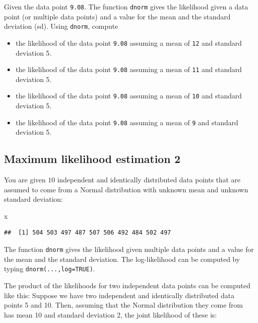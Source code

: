 \documentclass[12pt,]{krantz}
\newenvironment{Shaded}{\begin{snugshade}}{\end{snugshade}}
\newcommand{\NormalTok}[1]{#1}
\providecommand{\tightlist}{%
  \setlength{\itemsep}{0pt}\setlength{\parskip}{0pt}}
\theoremstyle{definition}
\theoremstyle{definition}
\theoremstyle{definition}
\theoremstyle{remark}
\begin{document}
Given the data point \texttt{9.08}.
The function \texttt{dnorm} gives the likelihood given a data point (or multiple data points) and a value for the mean and the standard deviation (sd). Using \texttt{dnorm}, compute

\begin{itemize}
\tightlist
\item
  the likelihood of the data point \texttt{9.08} assuming a mean of \texttt{12} and standard deviation 5.
\item
  the likelihood of the data point \texttt{9.08} assuming a mean of \texttt{11} and standard deviation 5.
\item
  the likelihood of the data point \texttt{9.08} assuming a mean of \texttt{10} and standard deviation 5.
\item
  the likelihood of the data point \texttt{9.08} assuming a mean of \texttt{9} and standard deviation 5.
\end{itemize}

\hypertarget{maximum-likelihood-estimation-2}{%
\subsection{Maximum likelihood estimation 2}\label{maximum-likelihood-estimation-2}}

You are given \(10\) independent and identically distributed data points that are assumed to come from a Normal distribution with unknown mean and unknown standard deviation:

\begin{Shaded}
\begin{Highlighting}[]
\NormalTok{x}
\end{Highlighting}
\end{Shaded}

\begin{verbatim}
##  [1] 504 503 497 487 507 506 492 484 502 497
\end{verbatim}

The function \texttt{dnorm} gives the likelihood given multiple data points and a value for the mean and the standard deviation. The log-likelihood can be computed by typing \texttt{dnorm(...,log=TRUE)}.

The product of the likelihoods for two independent data points can be computed like this: Suppose we have two independent and identically distributed data points 5 and 10. Then, assuming that the Normal distribution they come from has mean 10 and standard deviation 2, the joint likelihood of these is:
\end{document}
